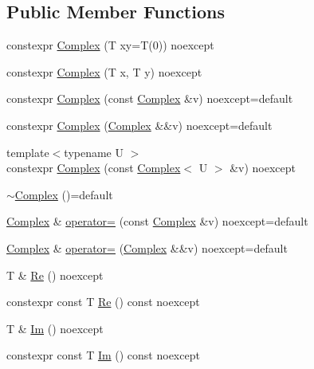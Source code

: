 \subsection*{Public Member Functions}
\begin{DoxyCompactItemize}
\item 
constexpr \mbox{\hyperlink{structmage_1_1_complex_ad790939a1d1b5718b5c01136264e676f}{Complex}} (T xy=T(0)) noexcept
\item 
constexpr \mbox{\hyperlink{structmage_1_1_complex_aaf50038b1531797405cbef543679057e}{Complex}} (T x, T y) noexcept
\item 
constexpr \mbox{\hyperlink{structmage_1_1_complex_a4f7e233a8b8dfb2cafba90278184b46b}{Complex}} (const \mbox{\hyperlink{structmage_1_1_complex}{Complex}} \&v) noexcept=default
\item 
constexpr \mbox{\hyperlink{structmage_1_1_complex_aa194b889d0f622f05fdbd0123c07dee2}{Complex}} (\mbox{\hyperlink{structmage_1_1_complex}{Complex}} \&\&v) noexcept=default
\item 
{\footnotesize template$<$typename U $>$ }\\constexpr \mbox{\hyperlink{structmage_1_1_complex_a1827aee389c671924710946eaeb0a326}{Complex}} (const \mbox{\hyperlink{structmage_1_1_complex}{Complex}}$<$ U $>$ \&v) noexcept
\item 
\mbox{\hyperlink{structmage_1_1_complex_a82b417379ea4178ed43814b35c6101fb}{$\sim$\+Complex}} ()=default
\item 
\mbox{\hyperlink{structmage_1_1_complex}{Complex}} \& \mbox{\hyperlink{structmage_1_1_complex_a218aa40a119f3f23b2c5b197fc34d694}{operator=}} (const \mbox{\hyperlink{structmage_1_1_complex}{Complex}} \&v) noexcept=default
\item 
\mbox{\hyperlink{structmage_1_1_complex}{Complex}} \& \mbox{\hyperlink{structmage_1_1_complex_a5b8c3f912bb20b5ea1749508410dcfd5}{operator=}} (\mbox{\hyperlink{structmage_1_1_complex}{Complex}} \&\&v) noexcept=default
\item 
T \& \mbox{\hyperlink{structmage_1_1_complex_a5c48df5c9153a670122fb9e04f7bb1da}{Re}} () noexcept
\item 
constexpr const T \mbox{\hyperlink{structmage_1_1_complex_a3dfd0ae672c5b5763341c9d2d1192df8}{Re}} () const noexcept
\item 
T \& \mbox{\hyperlink{structmage_1_1_complex_a93dcc9fef5216840b37932a17e62c742}{Im}} () noexcept
\item 
constexpr const T \mbox{\hyperlink{structmage_1_1_complex_a32b35d2008d4942241c9d6c1c859101d}{Im}} () const noexcept

\end{DoxyCompactItemize}
